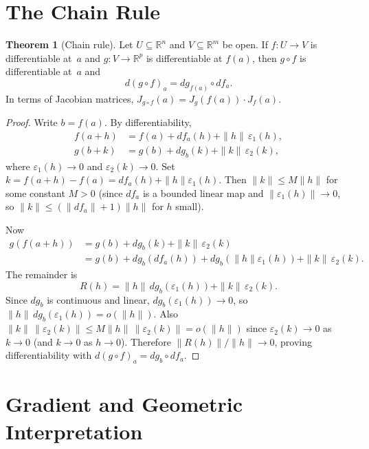 \documentclass[12pt,a4paper]{book}
\theoremstyle{definition}
\newtheorem{theorem}{Theorem}[chapter]
\begin{document}
\section{The Chain Rule}
\label{sec:chain-rule-multi}

\begin{theorem}[Chain rule]
\label{thm:chain-rule}
Let $U\subseteq\mathbb{R}^n$ and $V\subseteq\mathbb{R}^m$ be open.  If
$f\colon U\to V$ is differentiable at~$a$ and $g\colon V\to\mathbb{R}^p$
is differentiable at $f(a)$, then $g\circ f$ is differentiable at~$a$ and
\[
  d(g\circ f)_a = dg_{f(a)}\circ df_a.
\]
In terms of Jacobian matrices, $J_{g\circ f}(a)=J_g(f(a))\cdot J_f(a)$.
\end{theorem}

\begin{proof}
Write $b=f(a)$.  By differentiability,
\begin{align*}
  f(a+h) &= f(a) + df_a(h) + \|h\|\,\varepsilon_1(h), \\
  g(b+k) &= g(b) + dg_b(k) + \|k\|\,\varepsilon_2(k),
\end{align*}
where $\varepsilon_1(h)\to 0$ and $\varepsilon_2(k)\to 0$.  Set
$k=f(a+h)-f(a)=df_a(h)+\|h\|\varepsilon_1(h)$.  Then $\|k\|\le M\|h\|$
for some constant $M>0$ (since $df_a$ is a bounded linear map and
$\|\varepsilon_1(h)\|\to 0$, so $\|k\|\le(\|df_a\|+1)\|h\|$ for $h$ small).

Now
\begin{align*}
  g(f(a+h)) &= g(b) + dg_b(k) + \|k\|\,\varepsilon_2(k) \\
  &= g(b) + dg_b(df_a(h)) + dg_b(\|h\|\varepsilon_1(h))
     + \|k\|\,\varepsilon_2(k).
\end{align*}
The remainder is
\[
  R(h) = \|h\|\,dg_b(\varepsilon_1(h)) + \|k\|\,\varepsilon_2(k).
\]
Since $dg_b$ is continuous and linear, $dg_b(\varepsilon_1(h))\to 0$, so
$\|h\|\,dg_b(\varepsilon_1(h))=o(\|h\|)$.  Also
$\|k\|\,\|\varepsilon_2(k)\|\le M\|h\|\,\|\varepsilon_2(k)\| = o(\|h\|)$
since $\varepsilon_2(k)\to 0$ as $k\to 0$ (and $k\to 0$ as $h\to 0$).
Therefore $\|R(h)\|/\|h\|\to 0$, proving differentiability with
$d(g\circ f)_a = dg_b\circ df_a$.
\end{proof}

\section{Gradient and Geometric Interpretation}
\label{sec:gradient}
\end{document}
